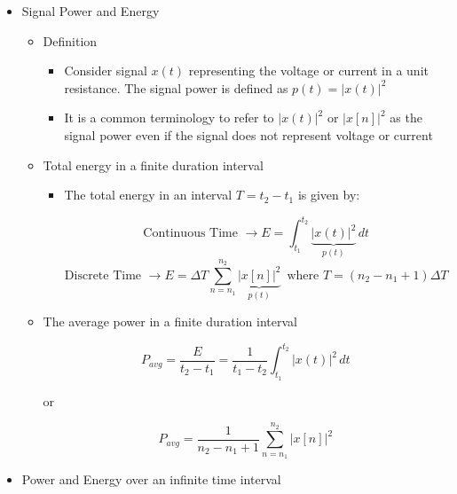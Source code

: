 \begin{itemize}

  \item Signal Power and Energy

    \begin{itemize}

      \item Definition

        \begin{itemize}

          \item Consider signal $x(t)$ representing the voltage or current in a unit resistance. The signal power is defined as $p(t)=|x(t)|^2$

          \item It is a common terminology to refer to $|x(t)|^2$ or $|x[n]|^2$ as the signal power even if the signal does not represent voltage or current

        \end{itemize}

      \item Total energy in a finite duration interval

        \begin{itemize}

          \item The total energy in an interval $T=t_2-t_1$ is given by:

            $$\text{Continuous Time } \to E=\int_{t_1}^{t_2} \underbrace{|x(t)|^2}_{p(t)}\,dt$$
            $$\text{Discrete Time } \to E=\Delta T\sum_{n=n_1}^{n_2}\underbrace{|x[n]|^2}_{p(t)}\,\text{ where }T=(n_2-n_1+1)\Delta T$$

        \end{itemize}

      \item The average power in a finite duration interval

        $$P_{avg}=\frac{E}{t_2-t_1}=\frac{1}{t_1-t_2}\int_{t_1}^{t_2}|x(t)|^2\,dt$$
        \begin{center}
          or
        \end{center}
        $$P_{avg}=\frac{1}{n_2-n_1+1}\sum_{n=n_1}^{n_2} |x[n]|^2$$

    \end{itemize}

  \item Power and Energy over an infinite time interval

    \begin{itemize}


\end{itemize}
\end{itemize}
